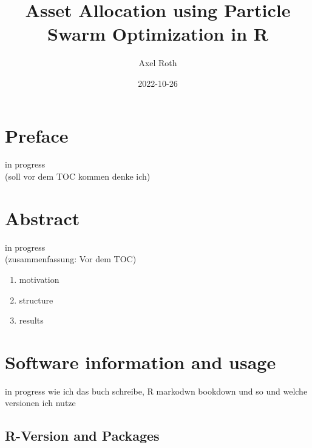 \documentclass[
  oneside]{book}
\title{Asset Allocation using Particle Swarm Optimization in R}
\author{Axel Roth}
\date{2022-10-26}
\begin{document}
\maketitle

{
\setcounter{tocdepth}{1}
\tableofcontents
}
\hypertarget{preface}{%
\chapter*{Preface}\label{preface}}

\renewcommand{\chaptermark}[1]{\markboth{\uppercase{#1}}{\uppercase{#1}}}

\textbar\textbar\textbar in progress\textbar\textbar\textbar{}\\
(soll vor dem TOC kommen denke ich)

\renewcommand{\chaptermark}[1]{\markboth{\uppercase{\thechapter. \ #1}}{}}

\hypertarget{abstract}{%
\chapter*{Abstract}\label{abstract}}

\textbar\textbar\textbar in progress\textbar\textbar\textbar{}\\
(zusammenfassung: Vor dem TOC)

\begin{enumerate}
\def\labelenumi{\arabic{enumi}.}
\item
  motivation
\item
  structure
\item
  results
\end{enumerate}

\hypertarget{software-information-and-usage}{%
\chapter{Software information and usage}\label{software-information-and-usage}}

\textbar\textbar\textbar in progress\textbar\textbar\textbar{}
wie ich das buch schreibe, R markodwn bookdown und so und welche versionen ich nutze

\hypertarget{r-version-and-packages}{%
\section{R-Version and Packages}\label{r-version-and-packages}}
\end{document}
